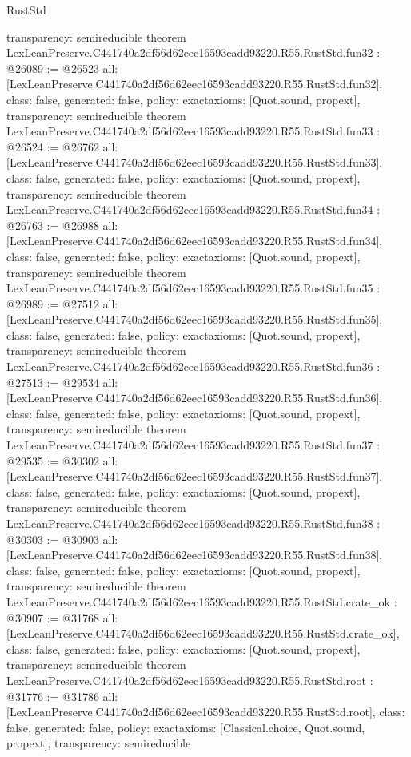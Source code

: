 \begin{lexlean}{RustStd}
\begin{coremodule}
{  transparency: semireducible
}
theorem LexLeanPreserve.C441740a2df56d62eec16593cadd93220.R55.RustStd.fun32 : @26089 := @26523 {
  all: [LexLeanPreserve.C441740a2df56d62eec16593cadd93220.R55.RustStd.fun32],
  class: false,
  generated: false,
  policy: exact{axioms: [Quot.sound, propext]},
  transparency: semireducible
}
theorem LexLeanPreserve.C441740a2df56d62eec16593cadd93220.R55.RustStd.fun33 : @26524 := @26762 {
  all: [LexLeanPreserve.C441740a2df56d62eec16593cadd93220.R55.RustStd.fun33],
  class: false,
  generated: false,
  policy: exact{axioms: [Quot.sound, propext]},
  transparency: semireducible
}
theorem LexLeanPreserve.C441740a2df56d62eec16593cadd93220.R55.RustStd.fun34 : @26763 := @26988 {
  all: [LexLeanPreserve.C441740a2df56d62eec16593cadd93220.R55.RustStd.fun34],
  class: false,
  generated: false,
  policy: exact{axioms: [Quot.sound, propext]},
  transparency: semireducible
}
theorem LexLeanPreserve.C441740a2df56d62eec16593cadd93220.R55.RustStd.fun35 : @26989 := @27512 {
  all: [LexLeanPreserve.C441740a2df56d62eec16593cadd93220.R55.RustStd.fun35],
  class: false,
  generated: false,
  policy: exact{axioms: [Quot.sound, propext]},
  transparency: semireducible
}
theorem LexLeanPreserve.C441740a2df56d62eec16593cadd93220.R55.RustStd.fun36 : @27513 := @29534 {
  all: [LexLeanPreserve.C441740a2df56d62eec16593cadd93220.R55.RustStd.fun36],
  class: false,
  generated: false,
  policy: exact{axioms: [Quot.sound, propext]},
  transparency: semireducible
}
theorem LexLeanPreserve.C441740a2df56d62eec16593cadd93220.R55.RustStd.fun37 : @29535 := @30302 {
  all: [LexLeanPreserve.C441740a2df56d62eec16593cadd93220.R55.RustStd.fun37],
  class: false,
  generated: false,
  policy: exact{axioms: [Quot.sound, propext]},
  transparency: semireducible
}
theorem LexLeanPreserve.C441740a2df56d62eec16593cadd93220.R55.RustStd.fun38 : @30303 := @30903 {
  all: [LexLeanPreserve.C441740a2df56d62eec16593cadd93220.R55.RustStd.fun38],
  class: false,
  generated: false,
  policy: exact{axioms: [Quot.sound, propext]},
  transparency: semireducible
}
theorem LexLeanPreserve.C441740a2df56d62eec16593cadd93220.R55.RustStd.crate_ok : @30907 := @31768 {
  all: [LexLeanPreserve.C441740a2df56d62eec16593cadd93220.R55.RustStd.crate_ok],
  class: false,
  generated: false,
  policy: exact{axioms: [Quot.sound, propext]},
  transparency: semireducible
}
theorem LexLeanPreserve.C441740a2df56d62eec16593cadd93220.R55.RustStd.root : @31776 := @31786 {
  all: [LexLeanPreserve.C441740a2df56d62eec16593cadd93220.R55.RustStd.root],
  class: false,
  generated: false,
  policy: exact{axioms: [Classical.choice, Quot.sound, propext]},
  transparency: semireducible
}


\end{coremodule}
\end{lexlean}

